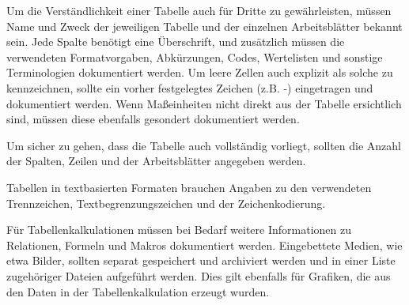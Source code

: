 Um die Verständlichkeit einer Tabelle auch für Dritte zu gewährleisten, müssen Name und Zweck der jeweiligen Tabelle und der einzelnen Arbeitsblätter bekannt sein. Jede Spalte benötigt eine Überschrift, und zusätzlich müssen die verwendeten Formatvorgaben, Abkürzungen, Codes, Wertelisten und sonstige Terminologien dokumentiert werden. Um leere Zellen auch explizit als solche zu kennzeichnen, sollte ein vorher festgelegtes Zeichen (z.B. -) eingetragen und dokumentiert werden. Wenn Maßeinheiten nicht direkt aus der Tabelle ersichtlich sind, müssen diese ebenfalls gesondert dokumentiert werden.

Um sicher zu gehen, dass die Tabelle auch vollständig vorliegt, sollten die Anzahl der Spalten, Zeilen und der Arbeitsblätter angegeben werden.

Tabellen in textbasierten Formaten brauchen Angaben zu den verwendeten Trennzeichen, Textbegrenzungszeichen und der Zeichenkodierung. 

Für Tabellenkalkulationen müssen bei Bedarf weitere Informationen zu Relationen, Formeln und Makros dokumentiert werden. Eingebettete Medien, wie etwa Bilder, sollten separat gespeichert und archiviert werden und in einer Liste zugehöriger Dateien aufgeführt werden. Dies gilt ebenfalls für Grafiken, die aus den Daten in der Tabellenkalkulation erzeugt wurden.

